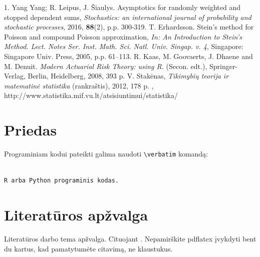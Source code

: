 \documentclass[12pt]{article}
\begin{document}

\begin{thebibliography}{99}

1. Yang Yang; R. Leipus, J. \v{S}iaulys. Asymptotics for randomly weighted and stopped dependent sums, \emph{Stochastics: an international journal of probability and stochastic processes}, 2016, \textbf{88}(2), p.p. 300-319.
  T. Erhardsson. Stein’s method for Poisson and compound Poisson approximation, \emph{In: An Introduction to Stein’s Method. Lect. Notes Ser. Inst. Math. Sci. Natl. Univ. Singap. v. 4}, Singapore: Singapore Univ. Press, 2005, p.p. 61–113.
 R. Kaas, M. Goovaerts, J. Dhaene  and M. Denuit. \emph{Modern Actuarial Risk Theory:
using R.} (Secon. edt.), Springer-Verlag, Berlin, Heidelberg,  2008, 393 p.
 V. Stakėnas, \emph{Tikimybių teorija ir matematinė statistika} (rankraštis), 2012, 178 p. , http://www.statistika.mif.vu.lt/atsisiuntimui/statistika/

\end{thebibliography}
\newpage


\section{Priedas}
Programiniam kodui pateikti galima naudoti  \verb|\verbatim| komandą:
\small  %
\begin{verbatim}

R arba Python programinis kodas.

\end{verbatim}



\section{Literatūros apžvalga}
Literatūros darbo tema apžvalga. Cituojant \cite{YLS16,KGDD08}. Nepamirškite pdflatex įvykdyti bent du kartus, kad pamatytumėte citavimą, ne klaustukus.
\end{document}
